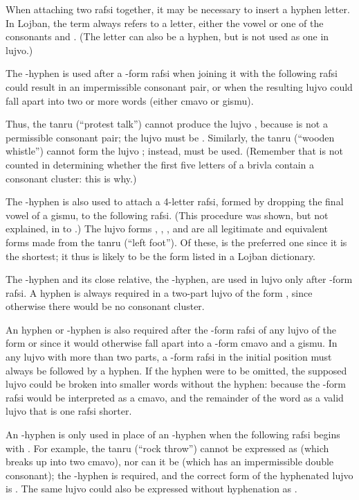 When attaching two rafsi together, it may be necessary to insert a hyphen letter. In Lojban, the term  always refers to a letter, either the vowel  or one of the consonants  and . (The letter  can also be a hyphen, but is not used as one in lujvo.)

The -hyphen is used after a -form rafsi when joining it with the following rafsi could result in an impermissible consonant pair, or when the resulting lujvo could fall apart into two or more words (either cmavo or gismu).

Thus, the tanru  (``protest talk'') cannot produce the lujvo , because  is not a permissible consonant pair; the lujvo must be . Similarly, the tanru  (``wooden whistle'') cannot form the lujvo ; instead,  must be used. (Remember that  is not counted in determining whether the first five letters of a brivla contain a consonant cluster: this is why.)

The -hyphen is also used to attach a 4-letter rafsi, formed by dropping the final vowel of a gismu, to the following rafsi. (This procedure was shown, but not explained, in  to .) The lujvo forms , , , and  are all legitimate and equivalent forms made from the tanru  (``left foot''). Of these,  is the preferred one since it is the shortest; it thus is likely to be the form listed in a Lojban dictionary.

The -hyphen and its close relative, the -hyphen, are used in lujvo only after -form rafsi. A hyphen is always required in a two-part lujvo of the form , since otherwise there would be no consonant cluster.

An hyphen or -hyphen is also required after the -form rafsi of any lujvo of the form  or  since it would otherwise fall apart into a -form cmavo and a gismu. In any lujvo with more than two parts, a -form rafsi in the initial position must always be followed by a hyphen. If the hyphen were to be omitted, the supposed lujvo could be broken into smaller words without the hyphen: because the -form rafsi would be interpreted as a cmavo, and the remainder of the word as a valid lujvo that is one rafsi shorter.

An -hyphen is only used in place of an -hyphen when the following rafsi begins with . For example, the tanru  (``rock throw'') cannot be expressed as  (which breaks up into two cmavo), nor can it be  (which has an impermissible double consonant); the -hyphen is required, and the correct form of the hyphenated lujvo is . The same lujvo could also be expressed without hyphenation as .

